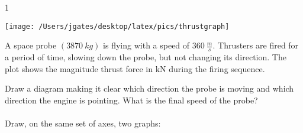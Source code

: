 
\AddToShipoutPicture*{\BackgroundPic}

\addtocounter {ProbNum} {1}

\begin{floatingfigure}[r]{.55\textwidth}
\texttt{[image: /Users/jgates/desktop/latex/pics/thrustgraph]}
\end{floatingfigure}
 
{\bf \Large{}} A space probe $(3870~kg)$ is flying with a speed of ${360~\tfrac{m}{s}}$. Thrusters are fired for a period of time, slowing down the probe, but not changing its direction. The plot shows the magnitude thrust force in kN during the firing sequence. 
\bigskip

Draw a diagram making it clear which direction the probe is moving and which direction the engine is pointing. What is the final speed of the probe?\paragraph{}
\noindent
\vfill

Draw, on the same set of axes, two graphs:
\vfill
\newpage
